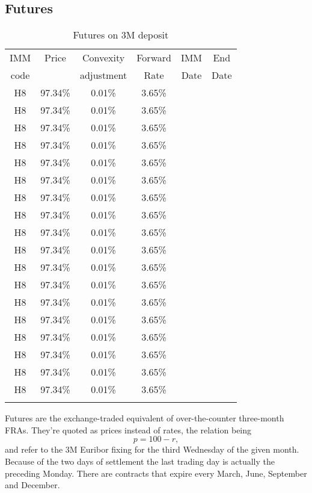 \documentclass[11pt,reqno]{amsart}
\begin{document}
\subsection{\label{SecFutures}Futures}
\begin{table}[tbp]
\label{tab:futures}
\begin{tabular}{cccccc}
IMM  & Price & Convexity  & Forward & IMM  & End  \\
code &       & adjustment & Rate    & Date & Date \\
H8 & 97.34\% & 0.01\% & 3.65\% &  &  \\
H8 & 97.34\% & 0.01\% & 3.65\% &  &  \\
H8 & 97.34\% & 0.01\% & 3.65\% &  &  \\
H8 & 97.34\% & 0.01\% & 3.65\% &  &  \\
H8 & 97.34\% & 0.01\% & 3.65\% &  &  \\
H8 & 97.34\% & 0.01\% & 3.65\% &  &  \\
H8 & 97.34\% & 0.01\% & 3.65\% &  &  \\
H8 & 97.34\% & 0.01\% & 3.65\% &  &  \\
H8 & 97.34\% & 0.01\% & 3.65\% &  &  \\
H8 & 97.34\% & 0.01\% & 3.65\% &  &  \\
H8 & 97.34\% & 0.01\% & 3.65\% &  &  \\
H8 & 97.34\% & 0.01\% & 3.65\% &  &  \\
H8 & 97.34\% & 0.01\% & 3.65\% &  &  \\
H8 & 97.34\% & 0.01\% & 3.65\% &  &  \\
H8 & 97.34\% & 0.01\% & 3.65\% &  &  \\
H8 & 97.34\% & 0.01\% & 3.65\% &  &  \\
H8 & 97.34\% & 0.01\% & 3.65\% &  &  \\
H8 & 97.34\% & 0.01\% & 3.65\% &  &  \\
&  &  &  &  &
\end{tabular}%
\caption{Futures on 3M deposit}
\end{table}

Futures are the exchange-traded equivalent of over-the-counter three-month FRAs.  They're quoted as prices instead of rates, the relation being
\begin{equation}
p = 100 - r,
\label{eqn:futurepricerate}
\end{equation}
and refer to the 3M Euribor fixing for the third Wednesday of the given month. Because of the two days of settlement the last trading day is actually the preceding Monday. There are contracts that expire every March, June, September and December. 
\end{document}
